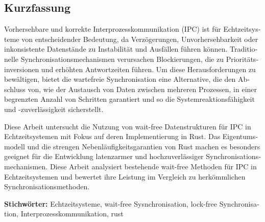 \cleardoublepage

\begin{otherlanguage}{ngerman}
\chapter*{Kurzfassung}


Vorhersehbare und korrekte Interprozesskommunikation (IPC) ist für Echtzeitsysteme von entscheidender Bedeutung, da Verzögerungen, Unvorhersehbarkeit oder inkonsistente Datenstände zu Instabilität und Ausfällen führen können. Traditionelle Synchronisationsmechanismen verursachen Blockierungen, die zu Prioritätsinversionen und erhöhten Antwortzeiten führen. Um diese Herausforderungen zu bewältigen, bietet die wartefreie Synchronisation eine Alternative, die den Abschluss von, wie der Austausch von Daten zwischen mehreren Prozessen, in einer begrenzten Anzahl von Schritten garantiert und so die Systemreaktionsfähigkeit und -zuverlässigkeit sicherstellt.

Diese Arbeit untersucht die Nutzung von wait-free Datenstrukturen für IPC in Echtzeitsystemen mit Fokus auf deren Implementierung in Rust. Das Eigentumsmodell und die strengen Nebenläufigkeitsgarantien von Rust machen es besonders geeignet für die Entwicklung latenzarmer und hochzuverlässiger Synchronisationsmechanismen. Diese Arbeit analysiert bestehende wait-free Methoden für IPC in Echtzeitsystemen und bewertet ihre Leistung im Vergleich zu herkömmlichen Synchronisationsmethoden.

\vfill
\noindent\textbf{Stichwörter:} Echtzeitsysteme, wait-free Sysnchronisation, lock-free Synchronisation, Interprozesskommunikation, rust
\vfill
\end{otherlanguage}
